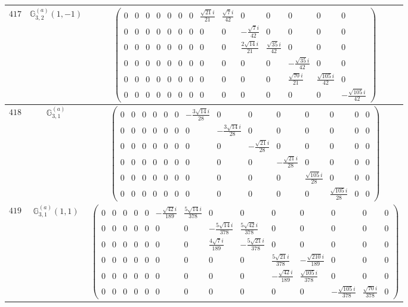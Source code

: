 \documentclass[fleqn,8pt,landscape]{jsarticle}
\begin{document}
\begin{center}
\begin{longtable}{ccc}
$ 417 $ & $ \mathbb{G}_{3,2}^{(a)}(1,-1) $ & $ \begin{pmatrix} 0 & 0 & 0 & 0 & 0 & 0 & 0 & \frac{\sqrt{21} i}{21} & \frac{\sqrt{7} i}{42} & 0 & 0 & 0 & 0 & 0 \\ 0 & 0 & 0 & 0 & 0 & 0 & 0 & 0 & 0 & - \frac{\sqrt{7} i}{42} & 0 & 0 & 0 & 0 \\ 0 & 0 & 0 & 0 & 0 & 0 & 0 & 0 & 0 & \frac{2 \sqrt{14} i}{21} & \frac{\sqrt{35} i}{42} & 0 & 0 & 0 \\ 0 & 0 & 0 & 0 & 0 & 0 & 0 & 0 & 0 & 0 & 0 & - \frac{\sqrt{35} i}{42} & 0 & 0 \\ 0 & 0 & 0 & 0 & 0 & 0 & 0 & 0 & 0 & 0 & 0 & \frac{\sqrt{70} i}{21} & \frac{\sqrt{105} i}{42} & 0 \\ 0 & 0 & 0 & 0 & 0 & 0 & 0 & 0 & 0 & 0 & 0 & 0 & 0 & - \frac{\sqrt{105} i}{42} \end{pmatrix} $ \\ \hline
$ 418 $ & $ \mathbb{G}_{3,1}^{(a)} $ & $ \begin{pmatrix} 0 & 0 & 0 & 0 & 0 & 0 & - \frac{3 \sqrt{14} i}{28} & 0 & 0 & 0 & 0 & 0 & 0 & 0 \\ 0 & 0 & 0 & 0 & 0 & 0 & 0 & - \frac{3 \sqrt{14} i}{28} & 0 & 0 & 0 & 0 & 0 & 0 \\ 0 & 0 & 0 & 0 & 0 & 0 & 0 & 0 & - \frac{\sqrt{21} i}{28} & 0 & 0 & 0 & 0 & 0 \\ 0 & 0 & 0 & 0 & 0 & 0 & 0 & 0 & 0 & - \frac{\sqrt{21} i}{28} & 0 & 0 & 0 & 0 \\ 0 & 0 & 0 & 0 & 0 & 0 & 0 & 0 & 0 & 0 & \frac{\sqrt{105} i}{28} & 0 & 0 & 0 \\ 0 & 0 & 0 & 0 & 0 & 0 & 0 & 0 & 0 & 0 & 0 & \frac{\sqrt{105} i}{28} & 0 & 0 \end{pmatrix} $ \\ \hline
$ 419 $ & $ \mathbb{G}_{3,1}^{(a)}(1,1) $ & $ \begin{pmatrix} 0 & 0 & 0 & 0 & 0 & - \frac{\sqrt{42} i}{189} & \frac{5 \sqrt{14} i}{378} & 0 & 0 & 0 & 0 & 0 & 0 & 0 \\ 0 & 0 & 0 & 0 & 0 & 0 & 0 & - \frac{5 \sqrt{14} i}{378} & \frac{5 \sqrt{42} i}{378} & 0 & 0 & 0 & 0 & 0 \\ 0 & 0 & 0 & 0 & 0 & 0 & 0 & \frac{4 \sqrt{7} i}{189} & - \frac{5 \sqrt{21} i}{378} & 0 & 0 & 0 & 0 & 0 \\ 0 & 0 & 0 & 0 & 0 & 0 & 0 & 0 & 0 & \frac{5 \sqrt{21} i}{378} & - \frac{\sqrt{210} i}{189} & 0 & 0 & 0 \\ 0 & 0 & 0 & 0 & 0 & 0 & 0 & 0 & 0 & - \frac{\sqrt{42} i}{189} & \frac{\sqrt{105} i}{378} & 0 & 0 & 0 \\ 0 & 0 & 0 & 0 & 0 & 0 & 0 & 0 & 0 & 0 & 0 & - \frac{\sqrt{105} i}{378} & \frac{\sqrt{70} i}{378} & 0 \end{pmatrix} $ \\ \hline

\end{longtable}
\end{center}
\end{document}
